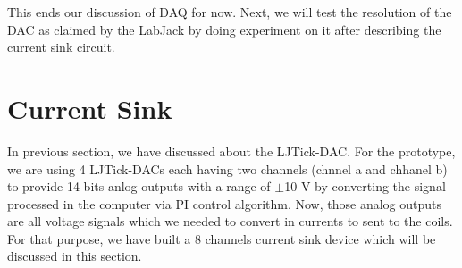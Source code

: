 


This ends our discussion of DAQ for now. Next, we will test the resolution of the DAC as claimed by the LabJack by doing experiment on it after describing the current sink circuit.


\section{Current Sink}\label{sec:sink}


In previous section, we have discussed about the LJTick-DAC. For the prototype, we are using 4 LJTick-DACs each having two channels (chnnel a and chhanel b) to provide 14 bits anlog outputs with a range of $\pm$10 V by converting the signal processed in the computer via PI control algorithm. Now, those analog outputs are all voltage signals which we needed to convert in currents to sent to the coils. For that purpose, we have built a 8 channels current sink device which will be discussed in this section. 


